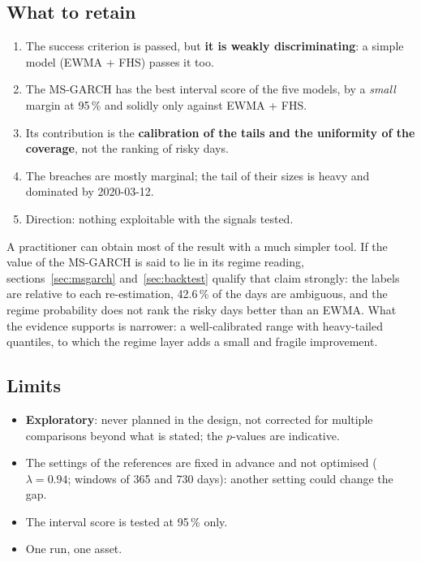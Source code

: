 \documentclass[12pt,a4paper]{article}
\begin{document}
\subsection{What to retain}

\begin{enumerate}
	\item The success criterion is passed, but \textbf{it is weakly discriminating}: a simple model (EWMA + FHS) passes it too.
	\item The MS-GARCH has the best interval score of the five models, by a \emph{small} margin at 95\,\% and solidly only against EWMA + FHS.
	\item Its contribution is the \textbf{calibration of the tails and the uniformity of the coverage}, not the ranking of risky days.
	\item The breaches are mostly marginal; the tail of their sizes is heavy and dominated by 2020-03-12.
	\item Direction: nothing exploitable with the signals tested.
\end{enumerate}

\begin{econbox}
	A practitioner can obtain most of the result with a much simpler tool. If the value of the MS-GARCH is said to lie in its regime reading, sections~\ref{sec:msgarch} and~\ref{sec:backtest} qualify that claim strongly: the labels are relative to each re-estimation, 42.6\,\% of the days are ambiguous, and the regime probability does not rank the risky days better than an EWMA. What the evidence supports is narrower: a well-calibrated range with heavy-tailed quantiles, to which the regime layer adds a small and fragile improvement.
\end{econbox}

\subsection{Limits}

\begin{itemize}
	\item \textbf{Exploratory}: never planned in the design, not corrected for multiple comparisons beyond what is stated; the $p$-values are indicative.
	\item The settings of the references are fixed in advance and not optimised ($\lambda=0.94$; windows of 365 and 730 days): another setting could change the gap.
	\item The interval score is tested at 95\,\% only.
	\item One run, one asset.
\end{itemize}
\end{document}
